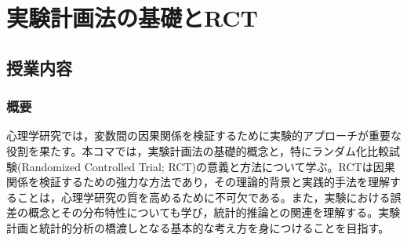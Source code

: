 \section{実験計画法の基礎とRCT}
\label{b17_design_RCT}

\subsection{授業内容}
\subsubsection{概要}
心理学研究では，変数間の因果関係を検証するために実験的アプローチが重要な役割を果たす。本コマでは，実験計画法の基礎的概念と，特にランダム化比較試験(Randomized Controlled Trial; RCT)の意義と方法について学ぶ。RCTは因果関係を検証するための強力な方法であり，その理論的背景と実践的手法を理解することは，心理学研究の質を高めるために不可欠である。また，実験における誤差の概念とその分布特性についても学び，統計的推論との関連を理解する。実験計画と統計的分析の橋渡しとなる基本的な考え方を身につけることを目指す。

